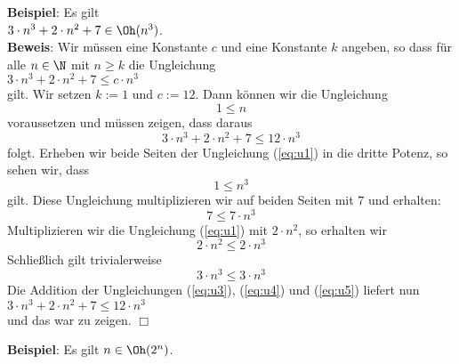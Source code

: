 \noindent
\textbf{Beispiel}: Es gilt \\[0.1cm]
\hspace*{1.3cm} $3 \cdot n^3 + 2 \cdot n^2 + 7 \in \Oh(n^3)$. \\[0.1cm]
\textbf{Beweis}: Wir m\"ussen eine Konstante $c$ und eine Konstante $k$ angeben, so dass f\"ur
alle $n\in \N$ mit $n \geq k$ die Ungleichung
\\[0.1cm]
\hspace*{1.3cm} 
$3 \cdot n^3 + 2 \cdot n^2 + 7 \leq c \cdot n^3$
\\[0.1cm]
gilt.  Wir setzen  $k := 1$ und $c := 12$. Dann k\"onnen wir die Ungleichung 
\begin{equation}
  \label{eq:u1}
  1\leq n  
\end{equation}
voraussetzen und m\"ussen zeigen, dass daraus 
\begin{equation}
  \label{eq:u2}
  3 \cdot n^3 + 2 \cdot n^2 + 7 \leq 12 \cdot n^3  
\end{equation}
folgt. Erheben wir beide Seiten der  Ungleichung (\ref{eq:u1}) in die dritte Potenz, so sehen wir,
dass 
\begin{equation}
  \label{eq:u3pre}
  1 \leq n^3  
\end{equation}
gilt.  Diese Ungleichung multiplizieren wir auf beiden Seiten mit $7$ und erhalten: 
\begin{equation}
  \label{eq:u3}
  7 \leq 7 \cdot n^3
\end{equation}
Multiplizieren wir die Ungleichung (\ref{eq:u1}) mit $2\cdot n^2$, so erhalten wir 
\begin{equation}
  \label{eq:u4}
  2 \cdot n^2 \leq 2 \cdot n^3  
\end{equation}
Schlie{\ss}lich gilt trivialerweise 
\begin{equation}
  \label{eq:u5}
  3 \cdot n^3 \leq 3 \cdot n^3
\end{equation}
Die Addition der Ungleichungen (\ref{eq:u3}), (\ref{eq:u4}) und (\ref{eq:u5}) liefert nun \\[0.1cm]
\hspace*{1.3cm} $3 \cdot n^3 + 2 \cdot n^2 + 7 \leq 12 \cdot n^3$ \\[0.1cm]
und das war zu zeigen. \hspace*{\fill} $\Box$
\vspace*{0.3cm}

\noindent
\textbf{Beispiel}: Es gilt  $n \in \Oh(2^n)$. 
\vspace*{0.3cm}

